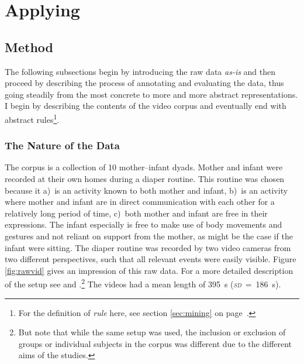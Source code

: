 
\chapter{Applying \fpmupper}
\label{ch:mining}

\section{Method}
\label{sec:miningmethod}
The following subsections begin by introducing the raw data \emph{as-is} and then proceed by describing the process of annotating and evaluating the data, thus going steadily from the most concrete to more and more abstract representations. I begin by describing the contents of the video corpus and eventually end with abstract rules\footnote{For the definition of \emph{rule} here, see section \ref{sec:mining} on page~\pageref{sec:mining}.}.

\subsection{The Nature of the Data}
\label{ssec:miningmethodnature}
The corpus is a collection of 10 mother--infant dyads. Mother and infant were recorded at their own homes during a diaper routine. This routine was chosen because it a)~is an activity known to both mother and infant, b)~is an activity where mother and infant are in direct communication with each other for a relatively long period of time, c)~both mother and infant are free in their expressions. The infant especially is free to make use of body movements and gestures and not reliant on support from the mother, as might be the case if the infant were sitting. The diaper routine was recorded by two video cameras from two different perspectives, such that all relevant events were easily visible. Figure \ref{fig:rawvid} gives an impression of this raw data. For a more detailed description of the setup see \citet[]{nomikou17} and \citet[]{nomikou11}.\footnote{But note that while the same setup was used, the inclusion or exclusion of groups or individual subjects in the corpus was different due to the different aims of the studies.} The videos had a mean length of 395~s (\emph{\textsc{sd}}~=~186~s).

